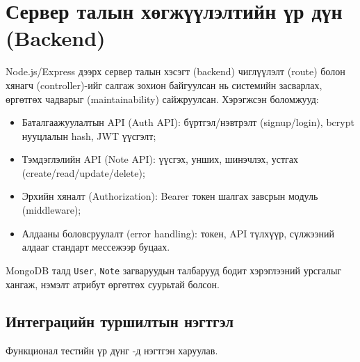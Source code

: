 \section{Сервер талын хөгжүүлэлтийн үр дүн (Backend)}
\label{sec:backend_results}

Node.js/Express дээрх сервер талын хэсэгт (backend) чиглүүлэлт (route) болон хянагч (controller)-ийг салгаж зохион байгуулсан нь системийн засварлах, өргөтгөх чадварыг (maintainability) сайжруулсан. Хэрэгжсэн боломжууд:

\begin{itemize}
    \item Баталгаажуулалтын API (Auth API): бүртгэл/нэвтрэлт (signup/login), bcrypt нууцлалын hash, JWT үүсгэлт;
    \item Тэмдэглэлийн API (Note API): үүсгэх, унших, шинэчлэх, устгах (create/read/update/delete);
    \item Эрхийн хяналт (Authorization): Bearer токен шалгах завсрын модуль (middleware);
    \item Алдааны боловсруулалт (error handling): токен, API түлхүүр, сүлжээний алдааг стандарт мессежээр буцаах.
\end{itemize}

MongoDB талд \texttt{User}, \texttt{Note} загваруудын талбарууд бодит хэрэглээний урсгалыг хангаж, нэмэлт атрибут өргөтгөх суурьтай болсон.

\subsection{Интеграцийн туршилтын нэгтгэл}
\label{subsec:integration_summary}

Функционал тестийн үр дүнг -д нэгтгэн харуулав.

